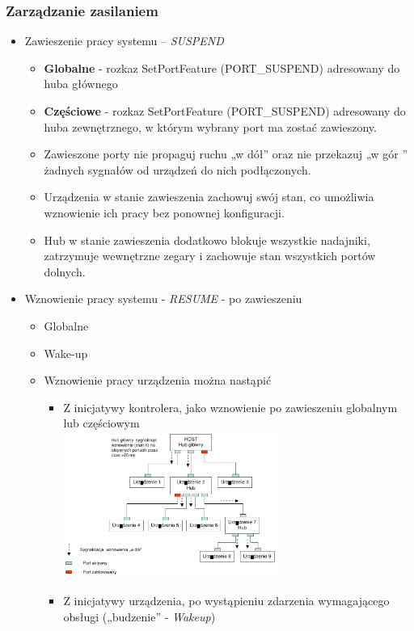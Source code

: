 \documentclass[a4paper,twoside]{article}
\begin{document}
	\subsubsection{Zarządzanie zasilaniem}
	\begin{itemize}
		\item Zawieszenie pracy systemu – \emph{SUSPEND}
		\begin{itemize}
			\item \textbf{Globalne} - rozkaz SetPortFeature (PORT\_SUSPEND) adresowany do huba głównego
			\item \textbf{Częściowe} - rozkaz SetPortFeature (PORT\_SUSPEND) adresowany do huba zewnętrznego, w którym wybrany port ma zostać zawieszony.
			\item Zawieszone porty nie propaguj ruchu „w dół” oraz nie przekazuj „w gór ” żadnych sygnałów od urządzeń do nich podłączonych.
			\item Urządzenia w stanie zawieszenia zachowuj swój stan, co umożliwia wznowienie ich pracy bez ponownej konfiguracji.
			\item Hub w stanie zawieszenia dodatkowo blokuje wszystkie nadajniki, zatrzymuje wewnętrzne zegary i zachowuje stan wszystkich portów dolnych.
		\end{itemize}
		\item Wznowienie pracy systemu - \emph{RESUME} - po zawieszeniu
		\begin{itemize}
			\item Globalne
			\item Wake-up
			\item Wznowienie pracy urządzenia można nastąpić
			\begin{itemize}
				\item Z inicjatywy kontrolera, jako wznowienie po zawieszeniu globalnym lub częściowym\\
				\includegraphics[width=7cm]{./wyklady/USB_43_1.pdf}
				\item Z inicjatywy urządzenia, po wystąpieniu zdarzenia wymagającego obsługi („budzenie” - \emph{Wakeup})\\

\end{itemize}
\end{itemize}
\end{itemize}
\end{document}
